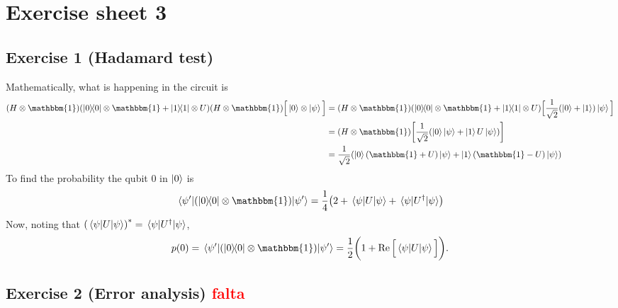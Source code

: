 \section{Exercise sheet 3}
\subsection{Exercise 1 (Hadamard test)}
Mathematically, what is happening in the circuit is
\begin{subequations}
\begin{align}
\qty(H\otimes\mathbbm{1})\qty(\dyad{0}{0}\otimes\mathbbm{1}+\dyad{1}{1}\otimes U)\qty(H\otimes \mathbbm{1})
\Big[\ket{0}\otimes \ket{\psi}\Big]&=
\qty(H\otimes\mathbbm{1})\qty(\dyad{0}{0}\otimes\mathbbm{1}+\dyad{1}{1}\otimes U)
\Big[\frac{1}{\sqrt{2}}\qty(\ket{0}+\ket{1})\ket{\psi}\Big]\\
&=\qty(H\otimes\mathbbm{1})\qty[\frac{1}{\sqrt{2}}\qty(\ket{0}\ket{\psi}+\ket{1}U\ket{\psi})]\\
&=\frac{1}{\sqrt{2}}
\qty(\ket{0}\qty(\mathbbm{1}+U)\ket{\psi}+
	\ket{1}\qty(\mathbbm{1}-U)\ket{\psi})
\end{align}
\end{subequations}
To find the probability the qubit $0$ in $\ket{0}$ is
\begin{align}
\matrixel{\psi'}{\qty(\dyad{0}{0}\otimes\mathbbm{1})}{\psi'}=
	\frac{1}{4}\qty(2+\matrixel{\psi}{U}{\psi}+\matrixel{\psi}{U^{\dagger}}{\psi})
\end{align}
Now, noting that $\qty(\matrixel{\psi}{U}{\psi})^*=\matrixel{\psi}{U^{\dagger}}{\psi}$,
\begin{align}
p(0)=\matrixel{\psi'}{\qty(\dyad{0}{0}\otimes\mathbbm{1})}{\psi'}=
	\frac{1}{2}\bigg(1+\Re \Big[\matrixel{\psi}{U}{\psi}\Big]\bigg).
\end{align}

\subsection{Exercise 2 (Error analysis) \textcolor{red}{falta}}

